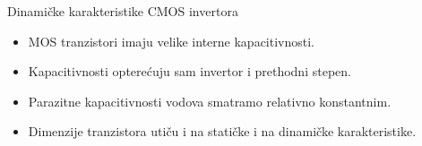 \begin{frame}[label=09_3-s002]{Dinamičke karakteristike CMOS invertora}
\begin{itemize}
\item MOS tranzistori imaju velike interne kapacitivnosti.
\item Kapacitivnosti opterećuju sam invertor i prethodni stepen.
\item Parazitne kapacitivnosti vodova smatramo relativno konstantnim.
\item Dimenzije tranzistora utiču i na \alert{statičke} i na \alert{dinamičke} karakteristike.
\end{itemize}
\end{frame}
